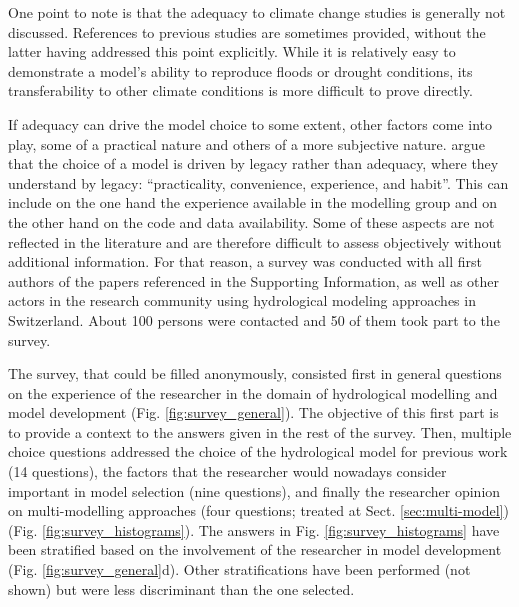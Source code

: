 \documentclass[10pt,a4paper]{article}
\begin{document}
One point to note is that the adequacy to climate change studies is generally not discussed. References to previous studies are sometimes provided, without the latter having addressed this point explicitly. While it is relatively easy to demonstrate a model's ability to reproduce floods or drought conditions, its transferability to other climate conditions is more difficult to prove directly. 

If adequacy can drive the model choice to some extent, other factors come into play, some of a practical nature and others of a more subjective nature. \citet{Addor2019} argue that the choice of a model is driven by legacy rather than adequacy, where they understand by legacy: ``practicality, convenience, experience, and habit''. This can include on the one hand the experience available in the modelling group and on the other hand on the code and data availability. Some of these aspects are not reflected in the literature and are therefore difficult to assess objectively without additional information. For that reason, a survey was conducted with all first authors of the papers referenced in the Supporting Information, as well as other actors in the research community using hydrological modeling approaches in Switzerland. About 100 persons were contacted and 50 of them took part to the survey.

The survey, that could be filled anonymously, consisted first in general questions on the experience of the researcher in the domain of hydrological modelling and model development (Fig. \ref{fig:survey_general}). The objective of this first part is to provide a context to the answers given in the rest of the survey. Then, multiple choice questions addressed the choice of the hydrological model for previous work (14 questions), the factors that the researcher would nowadays consider important in model selection (nine questions), and finally the researcher opinion on multi-modelling approaches (four questions; treated at Sect. \ref{sec:multi-model}) (Fig. \ref{fig:survey_histograms}). The answers in Fig. \ref{fig:survey_histograms} have been stratified based on the involvement of the researcher in model development (Fig. \ref{fig:survey_general}d). Other stratifications have been performed (not shown) but were less discriminant than the one selected.
\end{document}

